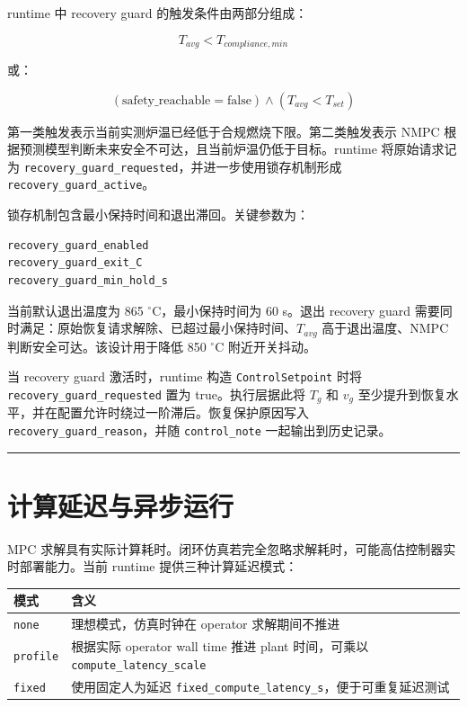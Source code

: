 \documentclass[UTF8,openany,zihao=-4,oneside]{ctexbook}
\providecommand{\passthrough}[1]{#1}
\newcommand{\manualdivider}{\par\vspace{0.6em}\noindent\textcolor{FGLine}{\rule{\linewidth}{0.7pt}}\vspace{0.6em}\par}
\begin{document}
runtime 中 recovery guard 的触发条件由两部分组成：

\[
T_{avg}<T_{compliance,min}
\]

或：

\[
\left(\mathrm{safety\_reachable}=\mathrm{false}\right)\land \left(T_{avg}<T_{set}\right)
\]

第一类触发表示当前实测炉温已经低于合规燃烧下限。第二类触发表示 NMPC 根据预测模型判断未来安全不可达，且当前炉温仍低于目标。runtime 将原始请求记为 \passthrough{\lstinline!recovery_guard_requested!}，并进一步使用锁存机制形成 \passthrough{\lstinline!recovery_guard_active!}。

锁存机制包含最小保持时间和退出滞回。关键参数为：

\begin{lstlisting}
recovery_guard_enabled
recovery_guard_exit_C
recovery_guard_min_hold_s
\end{lstlisting}

当前默认退出温度为 865 \(^\circ\mathrm{C}\)，最小保持时间为 60 s。退出 recovery guard 需要同时满足：原始恢复请求解除、已超过最小保持时间、\(T_{avg}\) 高于退出温度、NMPC 判断安全可达。该设计用于降低 850 \(^\circ\mathrm{C}\) 附近开关抖动。

当 recovery guard 激活时，runtime 构造 \passthrough{\lstinline!ControlSetpoint!} 时将 \passthrough{\lstinline!recovery_guard_requested!} 置为 true。执行层据此将 \(T_g\) 和 \(v_g\) 至少提升到恢复水平，并在配置允许时绕过一阶滞后。恢复保护原因写入 \passthrough{\lstinline!recovery_guard_reason!}，并随 \passthrough{\lstinline!control_note!} 一起输出到历史记录。

\manualdivider

\section{计算延迟与异步运行}\label{sec:compute-latency-policy}

MPC 求解具有实际计算耗时。闭环仿真若完全忽略求解耗时，可能高估控制器实时部署能力。当前 runtime 提供三种计算延迟模式：

\begin{longtable}[c]{@{}p{}p{}@{}}
\toprule\noalign{}
模式 & 含义 \\
\midrule\noalign{}
\endhead
\bottomrule\noalign{}
\endlastfoot
\passthrough{\lstinline!none!} & 理想模式，仿真时钟在 operator 求解期间不推进 \\
\passthrough{\lstinline!profile!} & 根据实际 operator wall time 推进 plant 时间，可乘以 \passthrough{\lstinline!compute_latency_scale!} \\
\passthrough{\lstinline!fixed!} & 使用固定人为延迟 \passthrough{\lstinline!fixed_compute_latency_s!}，便于可重复延迟测试 \\
\end{longtable}
\end{document}
